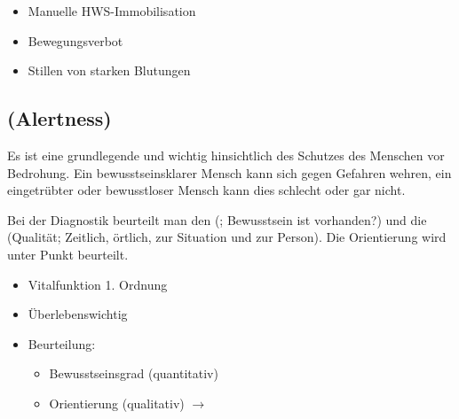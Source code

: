 {%
\begin{itemize}
  \item Manuelle HWS-Immobilisation
  \item Bewegungsverbot
  \item Stillen von starken Blutungen
\end{itemize}
}

\clearpage
\subsection{{} 
(Alertness)}



\label{topic:bewusstsein}



\TextSlide{\TxBeschreibung}
{
Es ist eine grundlegende
 und wichtig
hinsichtlich des Schutzes des Menschen vor Bedrohung. Ein bewusstseinsklarer
Mensch kann sich gegen Gefahren wehren, ein eingetrübter
oder bewusstloser Mensch kann dies schlecht oder gar nicht. 

Bei der Diagnostik beurteilt man 
den  (;
 Bewusstsein ist vorhanden?) und
die  (Qualität;  Zeitlich, örtlich, zur Situation und zur
Person). Die Orientierung wird unter
Punkt  beurteilt.
}{
\begin{itemize}
  \item Vitalfunktion 1. Ordnung
  \item Überlebenswichtig
  \item Beurteilung:
  \begin{itemize}
    \item Bewusstseinsgrad (quantitativ)
    \item Orientierung (qualitativ) $\rightarrow$ 
  \end{itemize}
\end{itemize}
}{}{}{}



